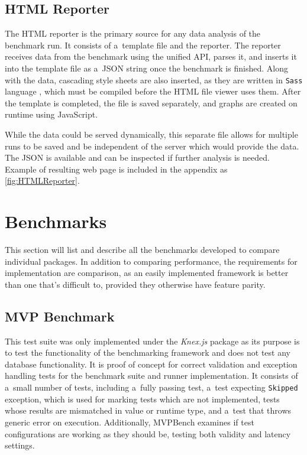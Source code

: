 \subsection*{HTML Reporter}
The HTML reporter is the primary source for any data analysis of the benchmark
run. It consists of a~template file and the reporter. The reporter receives data
from the benchmark using the unified API, parses it, and inserts it into the
template file as a~JSON string once the benchmark is finished. Along with the
data, cascading style sheets are also inserted, as they are written in
\texttt{Sass} language \cite{Sass}, which must be compiled before the HTML file
viewer uses them. After the template is completed, the file is saved separately,
and graphs are created on runtime using JavaScript.

While the data could be served dynamically, this separate file allows for
multiple runs to be saved and be independent of the server which would provide
the data. The JSON is available and can be inspected if further analysis is
needed. Example of resulting web page is included in the appendix as
\autoref{fig:HTMLReporter}.

\section{Benchmarks}
This section will list and describe all the benchmarks developed to compare
individual packages. In addition to comparing performance, the requirements for
implementation are comparison, as an easily implemented framework is better than
one that's difficult to, provided they otherwise have feature parity.

\subsection*{MVP Benchmark}
This test suite was only implemented under the \textit{Knex.js} package as its
purpose is to test the functionality of the benchmarking framework and does not
test any database functionality. It is proof of concept for correct validation
and exception handling tests for the benchmark suite and runner implementation.
It consists of a~small number of tests, including a~fully passing test, a~test
expecting \texttt{Skipped} exception, which is used for marking tests which are
not implemented, tests whose results are mismatched in value or runtime type,
and a~test that throws generic error on execution. Additionally, MVPBench
examines if test configurations are working as they should be, testing both
validity and latency settings.

